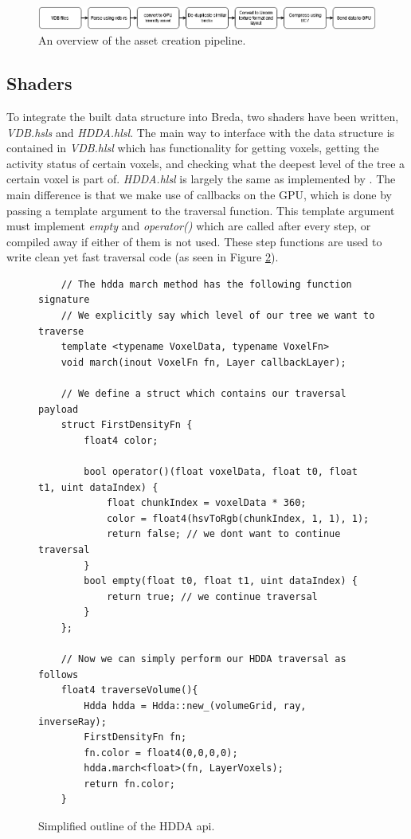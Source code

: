 \begin{figure}[H]
    \centering
    \includegraphics[width=0.9\linewidth]{figures/VDB asset pipeline.png}
    \caption{An overview of the asset creation pipeline.}
    \label{fig:vdb_asset_pipeline}
\end{figure}


\subsection{Shaders} \label{implementation:shaders}
To integrate the built data structure into Breda, two shaders have been written, \textit{VDB.hsls} and \textit{HDDA.hlsl}. The main way to interface with the data structure is contained in \textit{VDB.hlsl} which has functionality for getting voxels, getting the activity status of certain voxels, and checking what the deepest level of the tree a certain voxel is part of. \textit{HDDA.hlsl} is largely the same as implemented by \cite{museth2013vdb}. The main difference is that we make use of callbacks on the GPU, which is done by passing a template argument to the traversal function. This template argument must implement \textit{empty} and \textit{operator()} which are called after every step, or compiled away if either of them is not used. These step functions are used to write clean yet fast traversal code (as seen in Figure \ref{implementation:hdda_sample}).


\begin{figure}
    \begin{lstlisting}
    // The hdda march method has the following function signature
    // We explicitly say which level of our tree we want to traverse
    template <typename VoxelData, typename VoxelFn>
    void march(inout VoxelFn fn, Layer callbackLayer);

    // We define a struct which contains our traversal payload
    struct FirstDensityFn {
        float4 color;
    
        bool operator()(float voxelData, float t0, float t1, uint dataIndex) {
            float chunkIndex = voxelData * 360;
            color = float4(hsvToRgb(chunkIndex, 1, 1), 1);
            return false; // we dont want to continue traversal
        }
        bool empty(float t0, float t1, uint dataIndex) { 
            return true; // we continue traversal
        }
    };

    // Now we can simply perform our HDDA traversal as follows
    float4 traverseVolume(){
        Hdda hdda = Hdda::new_(volumeGrid, ray, inverseRay);
        FirstDensityFn fn;
        fn.color = float4(0,0,0,0);
        hdda.march<float>(fn, LayerVoxels); 
        return fn.color;
    }
\end{lstlisting}
    \caption{Simplified outline of the HDDA api.}\label{implementation:hdda_sample}
\end{figure}


